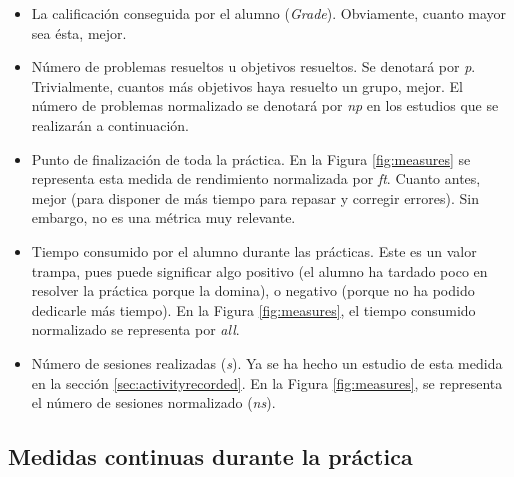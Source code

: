 \begin{itemize}
\item La calificación conseguida por el alumno (\emph{Grade}). Obviamente, cuanto mayor sea ésta, mejor.
\item Número de problemas resueltos u objetivos resueltos. Se denotará por \emph{p}. Trivialmente, cuantos más objetivos haya resuelto un grupo, mejor. El número de problemas normalizado se denotará por \emph{np} en los estudios que se realizarán a continuación.
\item Punto de finalización de toda la práctica. En la Figura \ref{fig:measures}  se representa esta medida de rendimiento normalizada por \emph{ft}. Cuanto antes, mejor (para disponer de más tiempo para repasar y corregir errores). Sin embargo, no es una métrica muy relevante.
\item Tiempo consumido por el alumno durante las prácticas. Este es un valor trampa, pues puede significar algo positivo (el alumno ha tardado poco en resolver la práctica porque la domina), o negativo (porque no ha podido dedicarle más tiempo). En la Figura \ref{fig:measures}, el tiempo consumido normalizado se representa por \emph{all}.
\item Número de sesiones realizadas (\emph{s}). Ya se ha hecho un estudio de esta medida en la sección \ref{sec:activityrecorded}. En la Figura \ref{fig:measures}, se representa el número de sesiones normalizado (\emph{ns}).
\end{itemize}

\subsection{Medidas continuas durante la práctica}

